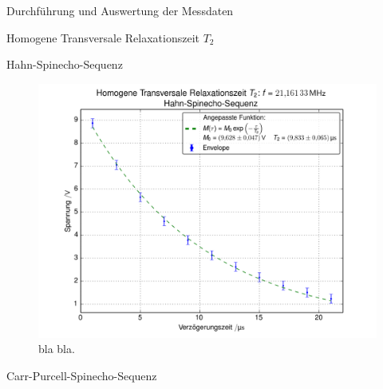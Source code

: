\documentclass[pdftex, a4paper,11pt, twoside, ngerman]{report}
\begin{document}
\begin{chapter}{Durchführung und Auswertung der Messdaten}
\begin{section}{
        Homogene Transversale Relaxationszeit $T_{2}$}
\begin{subsection}{Hahn-Spinecho-Sequenz}
        
        \begin{figure}[htb]
          \centering
          \includegraphics[width=\textwidth]
          {Figures/HomoTransRelax_Hahn.png}
          \caption{bla bla.}
          \label{figHahn}
        \end{figure}
        
        
      \end{subsection}
      
      
      \newpage
      \begin{subsection}{Carr-Purcell-Spinecho-Sequenz}
        \label{chpHomoTransRelaxCarr}
        
        
        

\end{subsection}
\end{section}
\end{chapter}
\end{document}
